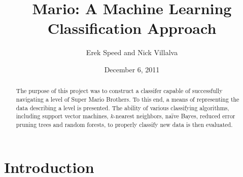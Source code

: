 \documentclass[]{article}   %
\begin{document}
\title{Mario: A Machine Learning Classification Approach}   %

\author{Erek Speed and Nick Villalva}         %
\date{December 6, 2011}    %
\maketitle

\begin{abstract}
 The purpose of this project was to construct a classifer capable of successfully navigating a level of Super Mario Brothers. To this end, a means of representing the data describing a level is presented. The ability of various classifying algorithms, including support vector machines, $k$-nearest neighbors, na\"{i}ve Bayes, reduced error pruning trees and random forests, to properly classify new data is then evaluated.
\end{abstract}

\section{Introduction}     %
\end{document}
